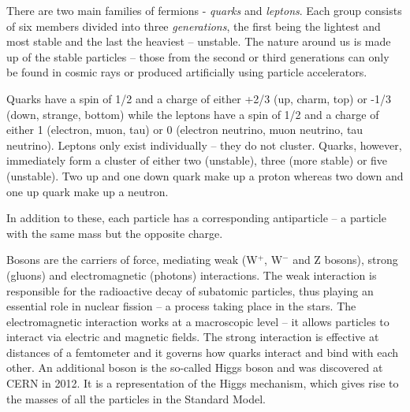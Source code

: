 \documentclass[12pt]{packages/mytustyle}  %
\begin{document}
There are two main families of fermions - \emph{quarks} and \emph{leptons}. Each group consists of six members divided into three \emph{generations}, the first being the lightest and most stable and the last the heaviest -- unstable. The nature around us is made up of the stable particles -- those from the second or third generations can only be found in cosmic rays or produced artificially using particle accelerators.

Quarks have a spin of 1/2 and a charge of either +2/3 (up, charm, top)  or -1/3  (down, strange, bottom) while the leptons have a spin of 1/2  and a charge of either 1 (electron, muon, tau) or 0 (electron neutrino, muon neutrino, tau neutrino). Leptons only exist individually -- they do not cluster. Quarks, however, immediately form a cluster of either two (unstable), three (more stable) or five (unstable). Two up and one down quark make up a proton whereas two down and one up quark make up a neutron.

In addition to these, each particle has a corresponding antiparticle -- a particle with the same mass but the opposite charge.

Bosons are the carriers of force, mediating weak (W$^+$, W$^-$ and Z bosons), strong (gluons) and electromagnetic (photons) interactions. The weak interaction is responsible for the radioactive decay of subatomic particles, thus playing an essential role in nuclear fission -- a process taking place in the stars. The electromagnetic interaction works at a macroscopic level -- it allows particles to interact via electric and magnetic fields. The strong interaction is effective at distances of a femtometer and it governs how quarks interact and bind with each other. An additional boson is the so-called Higgs boson and was discovered at CERN in 2012. It is a representation of the Higgs mechanism, which gives rise to the masses of all the particles in the Standard Model.
\end{document}
